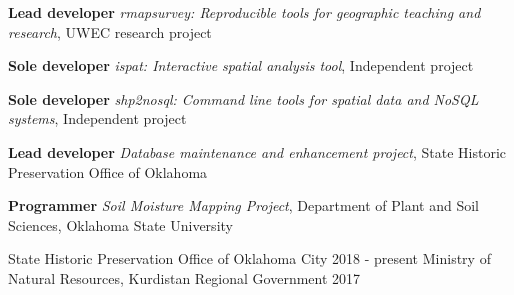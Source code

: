 


\begin{softwareproject}
  \software
  {\textbf{Lead developer}}
  {\textit{rmapsurvey: Reproducible tools for geographic teaching and research},
    UWEC research project}
  {\href{https://gitlab.com/mhaffner/rmapsurvey}{\color{awesome}{https://gitlab.com/mhaffner/rmapsurvey}}}

  \software
  {\textbf{Sole developer}}
  {\textit{ispat: Interactive spatial analysis tool}, Independent project}
  {\href{https://geohaff.com/ispat}{\color{awesome}{https://geohaff.com/ispat}}}

  \software
  {\textbf{Sole developer}}
  {\textit{shp2nosql: Command line tools for spatial data and
      NoSQL systems}, Independent project}
  {\href{https://github.com/mhaffner/shp2nosql}{\color{awesome}{https://github.com/mhaffner/shp2nosql}}}

  \software
  {\textbf{Lead developer}}
  {\textit{Database maintenance and enhancement project}, State
    Historic Preservation Office of Oklahoma}
  {\href{http://nr2_shpo.okstate.edu}{\color{awesome}{http://nr2\_shpo.okstate.edu}}}

  \software
  {\textbf{Programmer}}
  {\textit{Soil Moisture Mapping Project}, Department of Plant and Soil
    Sciences, Oklahoma State University}
  {\href{http://soilmoisture.okstate.edu}{\color{awesome}{http://soilmoisture.okstate.edu}}}

\end{softwareproject}


\begin{cvmemberships}
  \cvmembership
    {\hspace{-3 em}}
    {State Historic Preservation Office of Oklahoma City}
    {2018 - present}
    {} %
  \cvmembership
    {\hspace{-3 em}}
    {Ministry of Natural Resources, Kurdistan Regional Government}
    {\hspace{-2 em} 2017}
    {} %
\end{cvmemberships}